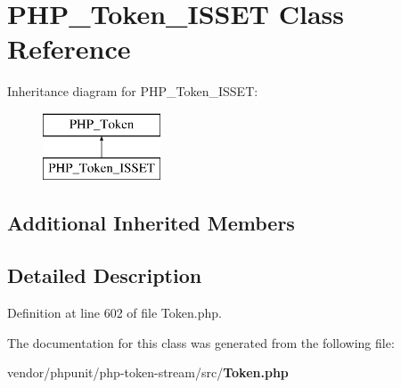 \section{P\+H\+P\+\_\+\+Token\+\_\+\+I\+S\+S\+E\+T Class Reference}
\label{class_p_h_p___token___i_s_s_e_t}
Inheritance diagram for P\+H\+P\+\_\+\+Token\+\_\+\+I\+S\+S\+E\+T\+:\begin{figure}[H]
\begin{center}
\leavevmode
\includegraphics[height=2.000000cm]{class_p_h_p___token___i_s_s_e_t}
\end{center}
\end{figure}
\subsection*{Additional Inherited Members}


\subsection{Detailed Description}


Definition at line 602 of file Token.\+php.



The documentation for this class was generated from the following file\+:\begin{DoxyCompactItemize}
\item 
vendor/phpunit/php-\/token-\/stream/src/{\bf Token.\+php}\end{DoxyCompactItemize}
